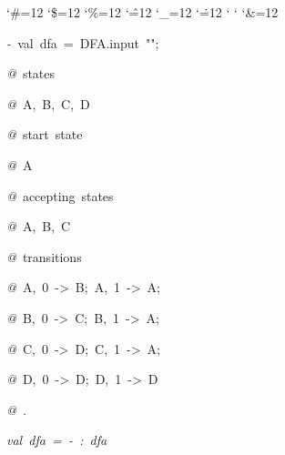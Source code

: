 \begin{list}{}
{\setlength{\leftmargin}{\leftmargini}
\setlength{\rightmargin}{0cm}
\setlength{\itemindent}{0cm}
\setlength{\listparindent}{0cm}
\setlength{\itemsep}{0cm}
\setlength{\parsep}{0cm}
\setlength{\labelsep}{0cm}
\setlength{\labelwidth}{0cm}
\catcode`\#=12
\catcode`\$=12
\catcode`\%=12
\catcode`\^=12
\catcode`\_=12
\catcode`\.=12
\catcode`
\catcode`
\catcode`\&=12
\ttfamily}
\small
\item[]\textsl{-\ }val\ dfa\ =\ DFA.input\ "";
\item[]\textsl{@\ }states
\item[]\textsl{@\ }A,\ B,\ C,\ D
\item[]\textsl{@\ }start\ state
\item[]\textsl{@\ }A
\item[]\textsl{@\ }accepting\ states
\item[]\textsl{@\ }A,\ B,\ C
\item[]\textsl{@\ }transitions
\item[]\textsl{@\ }A,\ 0\ ->\ B;\ A,\ 1\ ->\ A;
\item[]\textsl{@\ }B,\ 0\ ->\ C;\ B,\ 1\ ->\ A;
\item[]\textsl{@\ }C,\ 0\ ->\ D;\ C,\ 1\ ->\ A;
\item[]\textsl{@\ }D,\ 0\ ->\ D;\ D,\ 1\ ->\ D
\item[]\textsl{@\ }.
\item[]\textsl{val\ dfa\ =\ -\ :\ dfa}
\end{list}
